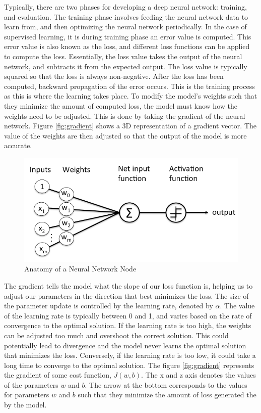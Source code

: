\documentclass[12pt]{article}
\begin{document}
Typically, there are two phases for developing a deep neural network: training, and evaluation.  The training phase involves feeding the neural network data to learn from, and then optimizing the neural network periodically.  In the case of supervised learning, it is during training phase  an error value is computed.  This error value is also known as the loss, and different loss functions can be applied to compute the loss.  Essentially, the loss value takes the output of the neural network, and subtracts it from the expected output.  The loss value is typically squared  so that the loss is always non-negative.  After the loss has been computed, backward propagation of the error occurs.  This is the training process as this is where the learning takes place.  To modify the model’s weights such that they minimize the amount of computed loss, the model must know how the weights need to be adjusted.  This is done by taking the gradient of the neural network. Figure \ref{fig:gradient} shows a 3D representation of a gradient vector. The value of the weights are then adjusted so that the output of the model is more accurate.  

\begin{figure} [h!]
    \centering
    \includegraphics[width=.7\textwidth, height=0.2\textheight]{activation.png}
    \caption{Anatomy of a Neural Network Node \cite{skymind}}
    \label{fig:activation}
\end{figure}


The gradient tells the model what the slope of our loss function is, helping us to adjust our parameters in the direction that best minimizes the loss.  The size of the parameter update is controlled by the learning rate, denoted by $\alpha$.  The value of the learning rate is typically between 0 and 1, and varies based on the rate of convergence to the optimal solution.  If the learning rate is too high, the weights can be adjusted too much and overshoot the correct solution.  This could potentially lead to divergence and the model never learns the optimal solution that minimizes the loss.  Conversely, if the learning rate is too low, it could take a long time to converge to the optimal solution.  The figure \ref{fig:gradient} represents the gradient of some cost function, $J(w,b)$.  The x and z axis denotes the values of the parameters $w$ and $b$.  The arrow at the bottom corresponds to the values for parameters $w$ and $b$ such that they minimize the amount of loss generated the by the model.
\end{document}
